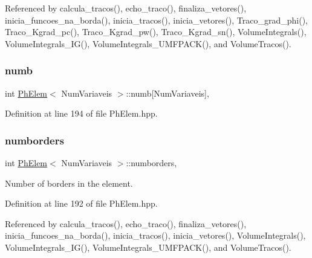Referenced by calcula\+\_\+tracos(), echo\+\_\+traco(), finaliza\+\_\+vetores(), inicia\+\_\+funcoes\+\_\+na\+\_\+borda(), inicia\+\_\+tracos(), inicia\+\_\+vetores(), Traco\+\_\+grad\+\_\+phi(), Traco\+\_\+\+Kgrad\+\_\+pc(), Traco\+\_\+\+Kgrad\+\_\+pw(), Traco\+\_\+\+Kgrad\+\_\+sn(), Volume\+Integrals(), Volume\+Integrals\+\_\+\+I\+G(), Volume\+Integrals\+\_\+\+U\+M\+F\+P\+A\+C\+K(), and Volume\+Tracos().

\mbox{\label{classPhElem_ad95c9f8ee7a993ccc7f9cdd08dddf5f6}} 
\subsubsection{\texorpdfstring{numb}{numb}}
{\footnotesize\ttfamily int \hyperlink{classPhElem}{Ph\+Elem}$<$ Num\+Variaveis $>$\+::numb\mbox{[}Num\+Variaveis\mbox{]}\hspace{0.3cm}{\ttfamily [protected]}, {\ttfamily [inherited]}}



Definition at line 194 of file Ph\+Elem.\+hpp.

\mbox{\label{classPhElem_ad24d6fbe02539875405dd4a6cf094284}} 
\subsubsection{\texorpdfstring{numborders}{numborders}}
{\footnotesize\ttfamily int \hyperlink{classPhElem}{Ph\+Elem}$<$ Num\+Variaveis $>$\+::numborders\hspace{0.3cm}{\ttfamily [protected]}, {\ttfamily [inherited]}}



Number of borders in the element. 



Definition at line 192 of file Ph\+Elem.\+hpp.



Referenced by calcula\+\_\+tracos(), echo\+\_\+traco(), finaliza\+\_\+vetores(), inicia\+\_\+funcoes\+\_\+na\+\_\+borda(), inicia\+\_\+tracos(), inicia\+\_\+vetores(), Volume\+Integrals(), Volume\+Integrals\+\_\+\+I\+G(), Volume\+Integrals\+\_\+\+U\+M\+F\+P\+A\+C\+K(), and Volume\+Tracos().

